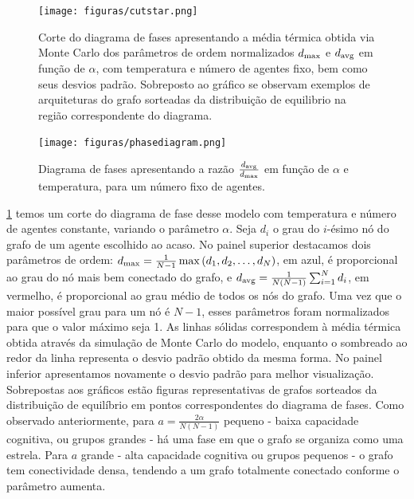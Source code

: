 \begin{figure}
  \texttt{[image: figuras/cutstar.png]}
  \caption[Corte do diagrama de fases apresentando a média térmica obtida via  Monte Carlo.]{\label{fig:cutstar} Corte do diagrama de fases apresentando a média térmica obtida via  Monte Carlo dos parâmetros de ordem normalizados $d_{\text{max}}$ e $d_{\text{avg}}$ em função de $\alpha$, com temperatura e número de agentes fixo, bem como seus desvios padrão. Sobreposto ao gráfico se observam exemplos de arquiteturas do grafo sorteadas da distribuição de equilibrio na região correspondente do diagrama. }
\end{figure}
\begin{fullwidth}
\begin{figure}
	\texttt{[image: figuras/phasediagram.png]}
 	\caption{\label{fig:phasediagram} Diagrama de fases apresentando a razão $\frac{d_{\text{avg}}}{d_{\text{max}}}$ em função de $\alpha$ e temperatura, para um número fixo de agentes.}
\end{figure}
\end{fullwidth}
 \ref{fig:cutstar} temos um corte do diagrama de fase desse modelo com temperatura e número de agentes constante, variando o parâmetro $\alpha$. Seja $d_i$ o grau do $i$-ésimo nó do grafo de um agente escolhido ao acaso. No painel superior destacamos dois parâmetros de ordem: $d_{\text{max}} = \frac{1}{N-1}\max\left(d_1, d_2,\ldots, d_N\right)$, em azul, é proporcional ao grau do nó mais bem conectado do grafo, e $d_{\text{avg}} = \frac{1}{N(N-1)}\sum_{i=1}^N d_i$, em vermelho, é proporcional ao grau médio de todos os nós do grafo. Uma vez que o maior possível grau para um nó é $N-1$, esses parâmetros foram normalizados para que o valor máximo seja 1. As linhas sólidas correspondem à média térmica obtida através da simulação de Monte Carlo do modelo, enquanto o sombreado ao redor da linha representa o desvio padrão obtido da mesma forma. No painel inferior apresentamos novamente o desvio padrão para melhor visualização. Sobrepostas aos gráficos estão figuras representativas de grafos sorteados da 
distribuição de equilíbrio em pontos correspondentes do diagrama de fases. Como observado anteriormente, para $a = \frac{2\alpha}{N(N-1)}$ pequeno - baixa capacidade cognitiva, ou grupos grandes - há uma fase em que o grafo se organiza como uma estrela. Para $a$ grande - alta capacidade cognitiva ou grupos pequenos - o grafo tem conectividade densa, tendendo a um grafo totalmente conectado conforme o parâmetro aumenta. 

